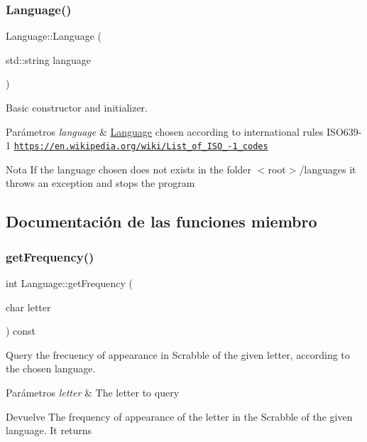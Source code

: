\subsubsection{\texorpdfstring{Language()}{Language()}}
{\footnotesize\ttfamily Language\+::\+Language (\begin{DoxyParamCaption}\item[{std\+::string}]{language }\end{DoxyParamCaption})}



Basic constructor and initializer. 


\begin{DoxyParams}{Parámetros}
{\em language} & \hyperlink{classLanguage}{Language} chosen according to international rules I\+S\+O639-\/1 \href{https://en.wikipedia.org/wiki/List_of_ISO_639-1_codes}{\tt https\+://en.\+wikipedia.\+org/wiki/\+List\+\_\+of\+\_\+\+I\+S\+O\+\_-\/1\+\_\+codes} \\
\hline
\end{DoxyParams}
\begin{DoxyNote}{Nota}
If the language chosen does not exists in the folder $<$root$>$/languages it throws an exception and stops the program 
\end{DoxyNote}


\subsection{Documentación de las funciones miembro}
\mbox{\label{classLanguage_ac727ac60a054ecd36e526fe93de8fc7f}} 
\subsubsection{\texorpdfstring{get\+Frequency()}{getFrequency()}}
{\footnotesize\ttfamily int Language\+::get\+Frequency (\begin{DoxyParamCaption}\item[{char}]{letter }\end{DoxyParamCaption}) const}



Query the frecuency of appearance in Scrabble of the given letter, according to the chosen language. 


\begin{DoxyParams}{Parámetros}
{\em letter} & The letter to query \\
\hline
\end{DoxyParams}
\begin{DoxyReturn}{Devuelve}
The frequency of appearance of the letter in the Scrabble of the given language. It returns 
\end{DoxyReturn}

